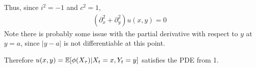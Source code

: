 \begin{solution}[Solution]
\begin{enumerate}
        Thus, since \( i^2 = -1  \) and \( c^2 = 1 \),
        \begin{align*}
            (\partial_x^2+\partial_y^2)u(x,y) = 0
        \end{align*}
        Note there is probably some issue with the partial derivative with respect to \( y \) at \( y=a \), since \( |y-a| \) is not differentiable at this point.

        Therefore \( u(x,y) = \mathbb{E}[\phi(X_\tau) | X_t = x, Y_t = y] \) satisfies the PDE from 1.
\end{enumerate}

\end{solution}


